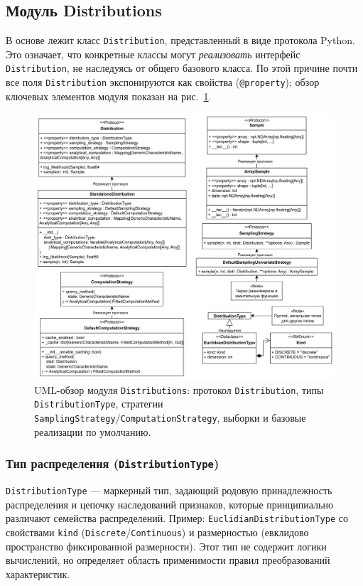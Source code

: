 \subsection{Модуль Distributions}
В основе лежит класс \texttt{Distribution}, представленный в виде протокола Python. Это означает, что конкретные классы могут \emph{реализовать} интерфейс \texttt{Distribution}, не наследуясь от общего базового класса. По этой причине почти все поля \texttt{Distribution} экспонируются как свойства (\texttt{@property}); обзор ключевых элементов модуля показан на рис.~\ref{fig:uml-distributions}.

\begin{figure}[h]
  \centering
  \includegraphics[width=.66\linewidth,trim=4mm 4mm 4mm 4mm,clip]{assets/images/Distrs.png}
  \caption{UML-обзор модуля \texttt{Distributions}: протокол \texttt{Distribution},
  типы \texttt{DistributionType}, стратегии \texttt{SamplingStrategy}/\texttt{ComputationStrategy},
  выборки и базовые реализации по умолчанию.}
  \label{fig:uml-distributions}
\end{figure}

\subsubsection{Тип распределения (\texttt{DistributionType})}

\texttt{DistributionType} — маркерный тип, задающий родовую принадлежность распределения и цепочку наследований признаков, которые принципиально различают семейства распределений. Пример: \texttt{EuclidianDistributionType} со свойствами \texttt{kind} (\texttt{Discrete}/\texttt{Continuous}) и размерностью (евклидово пространство фиксированной размерности). Этот тип не содержит логики вычислений, но определяет область применимости правил преобразований характеристик.

